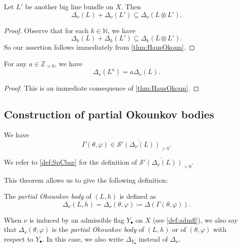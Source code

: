 \begin{proposition}\label{prop:subaddOkoun}
    Let $L'$ be another big line bundle on $X$. Then
    \[
    \Delta_{\nu}(L)+\Delta_{\nu}(L')\subseteq \Delta_{\nu}(L\otimes L').
    \]
\end{proposition}
\begin{proof}
    Observe that for each $k\in \mathbb{N}$, we have
    \[
    \Delta_k(L)+\Delta_k(L')\subseteq \Delta_k(L\otimes L').
    \]
    So our assertion follows immediately from \cref{thm:HausOkoun}.
\end{proof}

\begin{proposition}\label{prop:Okourescaling}
    For any $a\in \mathbb{Z}_{>0}$, we have
    \[
    \Delta_{\nu}(L^a)=a\Delta_{\nu}(L).
    \]
\end{proposition}
\begin{proof}
    This is an immediate consequence of \cref{thm:HausOkoun}.
\end{proof}

\subsection{Construction of partial Okounkov bodies}
\label{subsec:pob_construct}


\begin{theorem}\label{thm:Gammaasg}
    We have
    \[
    \Gamma(\theta,\varphi)\in \overline{\mathcal{S}'(\Delta_{\nu}(L))}_{>0}.
    \]
\end{theorem}
We refer to \cref{def:SpCbar} for the definition of $\overline{\mathcal{S}'(\Delta_{\nu}(L))}_{>0}$.


This theorem allows us to give the following definition:
\begin{definition}\label{def:Okounkov:L687}
The \emph{partial Okounkov body} of $(L,h)$ is defined as
\begin{equation}\label{eq:Deltalbdef}
\Delta_{\nu}(L,h)=\Delta_{\nu}(\theta,\varphi)\coloneqq \Delta \left(\Gamma(\theta,\varphi)\right).
\end{equation}
\end{definition}
When $\nu$ is induced by an admissible flag $Y_{\bullet}$ on $X$ (see \cref{def:admfl}), we also say that $\Delta_{\nu}(\theta,\varphi)$ is the \emph{partial Okounkov body} of $(L,h)$ or of $(\theta,\varphi)$ with respect to $Y_{\bullet}$. In this case, we also write $\Delta_{Y_{\bullet}}$ instead of $\Delta_{\nu}$.

